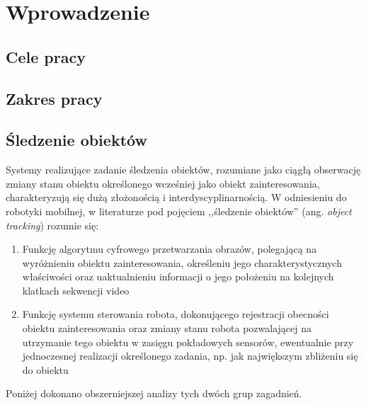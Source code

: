 \chapter{Wprowadzenie}
\label{cha:Wprowadzenie}


\section{Cele pracy}
\label{sec:Cele_pracy}


\section{Zakres pracy}
\label{sec:Zakres_pracy}

\section{Śledzenie obiektów}
\label{sec:Sledzenie_obiektow}
Systemy realizujące zadanie śledzenia obiektów, rozumiane jako ciągłą obserwację zmiany stanu obiektu określonego wcześniej jako obiekt zainteresowania, charakteryzują się dużą złożonością i interdyscyplinarnością. W odniesieniu do robotyki mobilnej, w literaturze pod pojęciem ,,śledzenie obiektów'' (ang. \textit{object tracking}) rozumie się:

\begin{enumerate}

	\item \label{itm:Algorytm_przetwarzania_obrazow} Funkcję algorytmu cyfrowego przetwarzania obrazów, polegającą na wyróżnieniu obiektu zainteresowania, określeniu jego charakterystycznych właściwości oraz uaktualnieniu informacji o jego położeniu na kolejnych klatkach sekwencji video

	\item \label{itm:System_sterowania} Funkcję systemu sterowania robota, dokonującego rejestracji obecności obiektu zainteresowania oraz zmiany stanu robota pozwalającej na utrzymanie tego obiektu w zasięgu pokładowych sensorów, ewentualnie przy jednoczesnej realizacji określonego zadania, np. jak największym zbliżeniu się do obiektu
	
\end{enumerate}

Poniżej dokonano obszerniejszej analizy tych dwóch grup zagadnień.

